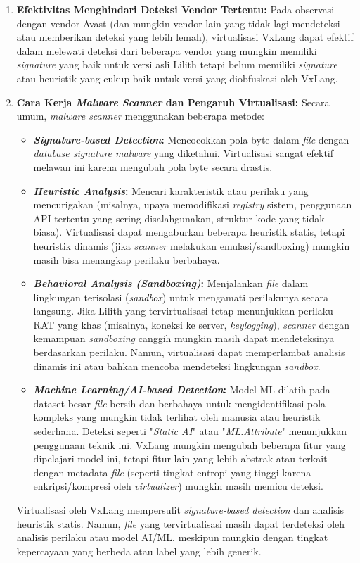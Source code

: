 \begin{enumerate}
    \item \textbf{Efektivitas Menghindari Deteksi Vendor Tertentu:} Pada observasi dengan vendor Avast (dan mungkin vendor lain yang tidak lagi mendeteksi atau memberikan deteksi yang lebih lemah), virtualisasi VxLang dapat efektif dalam melewati deteksi dari beberapa vendor yang mungkin memiliki \textit{signature} yang baik untuk versi asli Lilith tetapi belum memiliki \textit{signature} atau heuristik yang cukup baik untuk versi yang diobfuskasi oleh VxLang.

    \item \textbf{Cara Kerja \textit{Malware Scanner} dan Pengaruh Virtualisasi:}
        Secara umum, \textit{malware scanner} menggunakan beberapa metode:
        \begin{itemize}
            \item \textbf{\textit{Signature-based Detection}:} Mencocokkan pola byte dalam \textit{file} dengan \textit{database signature malware} yang diketahui. Virtualisasi sangat efektif melawan ini karena mengubah pola byte secara drastis.
            \item \textbf{\textit{Heuristic Analysis}:} Mencari karakteristik atau perilaku yang mencurigakan (misalnya, upaya memodifikasi \textit{registry} sistem, penggunaan API tertentu yang sering disalahgunakan, struktur kode yang tidak biasa). Virtualisasi dapat mengaburkan beberapa heuristik statis, tetapi heuristik dinamis (jika \textit{scanner} melakukan emulasi/sandboxing) mungkin masih bisa menangkap perilaku berbahaya.
            \item \textbf{\textit{Behavioral Analysis (Sandboxing)}:} Menjalankan \textit{file} dalam lingkungan terisolasi (\textit{sandbox}) untuk mengamati perilakunya secara langsung. Jika Lilith yang tervirtualisasi tetap menunjukkan perilaku RAT yang khas (misalnya, koneksi ke server, \textit{keylogging}), \textit{scanner} dengan kemampuan \textit{sandboxing} canggih mungkin masih dapat mendeteksinya berdasarkan perilaku. Namun, virtualisasi dapat memperlambat analisis dinamis ini atau bahkan mencoba mendeteksi lingkungan \textit{sandbox}.
            \item \textbf{\textit{Machine Learning/AI-based Detection}:} Model ML dilatih pada dataset besar \textit{file} bersih dan berbahaya untuk mengidentifikasi pola kompleks yang mungkin tidak terlihat oleh manusia atau heuristik sederhana. Deteksi seperti "\textit{Static AI}" atau "\textit{ML.Attribute}" menunjukkan penggunaan teknik ini. VxLang mungkin mengubah beberapa fitur yang dipelajari model ini, tetapi fitur lain yang lebih abstrak atau terkait dengan metadata \textit{file} (seperti tingkat entropi yang tinggi karena enkripsi/kompresi oleh \textit{virtualizer}) mungkin masih memicu deteksi.
        \end{itemize}
        Virtualisasi oleh VxLang mempersulit \textit{signature-based detection} dan analisis heuristik statis. Namun, \textit{file} yang tervirtualisasi masih dapat terdeteksi oleh analisis perilaku atau model AI/ML, meskipun mungkin dengan tingkat kepercayaan yang berbeda atau label yang lebih generik.


\end{enumerate}
